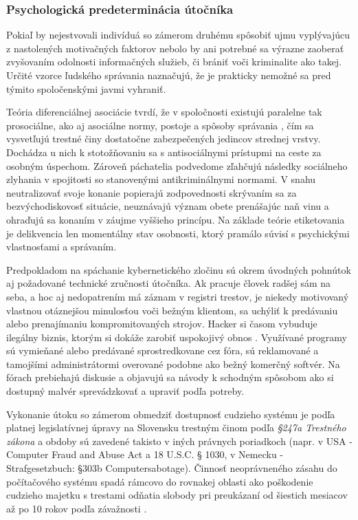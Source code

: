 \documentclass[12pt, a4paper]{article}
\begin{document}
\subsubsection{Psychologická predeterminácia útočníka}
Pokiaľ by nejestvovali indivíduá so zámerom druhému spôsobiť ujmu vyplývajúcu z nastolených motivačných
faktorov nebolo by ani potrebné sa výrazne zaoberať zvyšovaním odolnosti informačných služieb, či brániť
voči kriminalite ako takej. Určité vzorce ľudského správania naznačujú, že je prakticky nemožné sa pred 
týmito spoločenskými javmi vyhraniť.

Teória diferenciálnej asociácie tvrdí, že v spoločnosti existujú paralelne tak prosociálne, ako aj asociálne 
normy, postoje a spôsoby správania \cite{heretik}, čím sa vysvetľujú trestné činy dostatočne zabezpečených 
jedincov strednej vrstvy. Dochádza u nich k stotožňovaniu sa s antisociálnymi prístupmi na ceste za osobným 
úspechom. Zároveň páchatelia podvedome zľahčujú následky sociálneho zlyhania v spojitosti so stanovenými 
antikriminálnymi normami. V snahu neutralizovať svoje konanie popierajú zodpovednosti skrývaním sa za 
bezvýchodiskovosť situácie, neuznávajú význam obete  prenášajúc naň vinu a ohraďujú sa konaním v záujme 
vyššieho princípu. Na základe teórie etiketovania je delikvencia len momentálny stav osobnosti, ktorý 
pramálo súvisí s psychickými vlastnosťami a správaním.

Predpokladom na spáchanie kybernetického zločinu sú okrem úvodných pohnútok aj požadované technické 
zručnosti útočníka. Ak pracuje človek radšej sám na seba, a hoc aj nedopatrením má záznam v registri 
trestov, je niekedy motivovaný vlastnou otáznejšou minulosťou voči bežným klientom, sa uchýliť k predávaniu 
alebo prenajímaniu kompromitovaných strojov. Hacker si časom vybuduje ilegálny biznis, ktorým si dokáže 
zarobiť uspokojivý obnos \cite{infiltrating-botnet}. Využívané programy sú vymieňané alebo predávané 
sprostredkovane cez fóra, sú reklamované a tamojšími administrátormi overované podobne ako bežný komerčný 
softvér. Na fórach  prebiehajú diskusie a objavujú sa návody k schodným spôsobom ako si dostupný malvér 
sprevádzkovať a upraviť podľa potreby.

Vykonanie útoku so zámerom obmedziť dostupnosť cudzieho systému je podľa platnej legislatívnej úpravy 
na Slovensku trestným činom podľa \emph{§247a Trestného zákona} a obdoby sú zavedené takisto v iných 
právnych poriadkoch (napr. v USA - Computer Fraud and Abuse Act a 18 U.S.C. § 1030, v Nemecku - 
Strafgesetzbuch: §303b  Computersabotage). Činnosť neoprávneného zásahu do počítačového systému spadá 
rámcovo do rovnakej oblasti ako poškodenie cudzieho majetku s trestami odňatia slobody pri preukázaní od 
šiestich mesiacov až po 10 rokov podľa závažnosti \cite{trestny-zakon}. 
\end{document}
